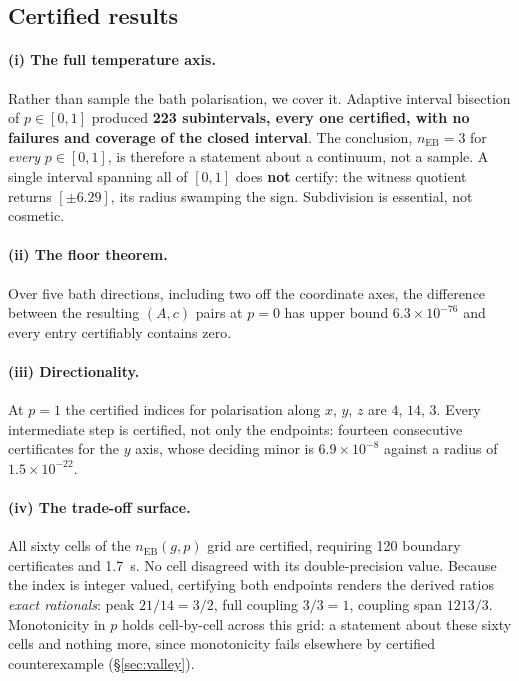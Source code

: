 \documentclass[11pt,a4paper]{article}
\theoremstyle{definition}
\theoremstyle{remark}
\newcommand{\nEB}{n_{\mathrm{EB}}}
\begin{document}
\subsection{Certified results}\label{sec:certresults}

\paragraph{(i) The full temperature axis.} Rather than sample the bath polarisation, we cover it. Adaptive interval bisection of $p \in [0,1]$ produced \textbf{223 subintervals, every one certified, with no failures and coverage of the closed interval}. The conclusion, $\nEB = 3$ for \emph{every} $p \in [0,1]$, is therefore a statement about a continuum, not a sample. A single interval spanning all of $[0,1]$ does \textbf{not} certify: the witness quotient returns $[\pm 6.29]$, its radius swamping the sign. Subdivision is essential, not cosmetic.

\paragraph{(ii) The floor theorem.} Over five bath directions, including two off the coordinate axes, the difference between the resulting $(A,c)$ pairs at $p=0$ has upper bound $6.3\times10^{-76}$ and every entry certifiably contains zero.

\paragraph{(iii) Directionality.} At $p=1$ the certified indices for polarisation along $x$, $y$, $z$ are $4$, $14$, $3$. Every intermediate step is certified, not only the endpoints: fourteen consecutive certificates for the $y$ axis, whose deciding minor is $6.9\times10^{-8}$ against a radius of $1.5\times10^{-22}$.

\paragraph{(iv) The trade-off surface.} All sixty cells of the $\nEB(g,p)$ grid are certified, requiring 120 boundary certificates and 1.7~s. No cell disagreed with its double-precision value. Because the index is integer valued, certifying both endpoints renders the derived ratios \emph{exact rationals}: peak $21/14 = 3/2$, full coupling $3/3 = 1$, coupling span $1213/3$. Monotonicity in $p$ holds cell-by-cell across this grid: a statement about these sixty cells and nothing more, since monotonicity fails elsewhere by certified counterexample (\S\ref{sec:valley}).
\end{document}
